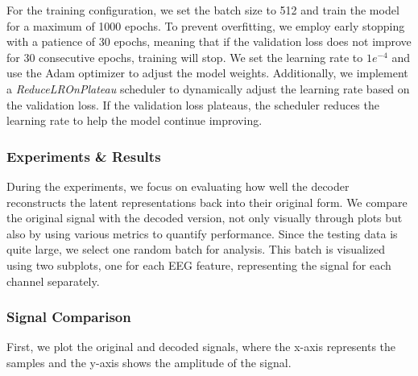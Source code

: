 For the training configuration, we set the batch size to 512 and train the model for a maximum of 1000 epochs. To prevent overfitting, we employ early stopping with a patience of 30 epochs, meaning that if the validation loss does not improve for 30 consecutive epochs, training will stop. We set the learning rate to $1e^{-4}$ and use the Adam optimizer to adjust the model weights. Additionally, we implement a \emph{ReduceLROnPlateau} scheduler to dynamically adjust the learning rate based on the validation loss. If the validation loss plateaus, the scheduler reduces the learning rate to help the model continue improving.

\subsubsection{Experiments \& Results}

During the experiments, we focus on evaluating how well the decoder reconstructs the latent representations back into their original form. We compare the original signal with the decoded version, not only visually through plots but also by using various metrics to quantify performance. Since the testing data is quite large, we select one random batch for analysis. This batch is visualized using two subplots, one for each EEG feature, representing the signal for each channel separately.

\subsubsection{Signal Comparison} First, we plot the original and decoded signals, where the x-axis represents the samples and the y-axis shows the amplitude of the signal.


